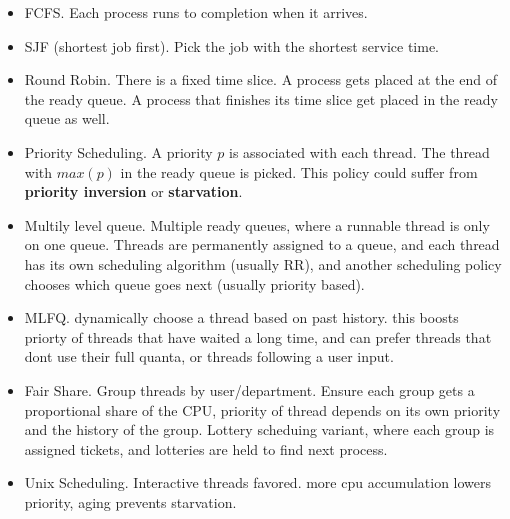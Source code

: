 \begin{itemize}
  \item FCFS. Each process runs to completion when it arrives.
  \item SJF (shortest job first). Pick the job with the shortest service time.
  \item Round Robin. There is a fixed time slice. A process gets placed at the
end of the ready queue. A process that finishes its time slice get placed in
the ready queue as well.
  \item Priority Scheduling. A priority $p$ is associated with each thread. The
thread with $max(p)$ in the ready queue is picked. This policy could suffer
from \textbf{priority inversion} or \textbf{starvation}.
  \item Multily level queue. Multiple ready queues, where a runnable thread is
    only on one queue. Threads are permanently assigned to a queue, and each
    thread has its own scheduling algorithm (usually RR), and another
    scheduling policy chooses which queue goes next (usually priority based).
  \item MLFQ. dynamically choose a thread based on past history. this boosts
    priorty of threads that have waited a long time, and can prefer threads
    that dont use their full quanta, or threads following a user input.
  \item Fair Share. Group threads by user/department. Ensure each group gets a
    proportional share of the CPU, priority of thread depends on its own
    priority and the history of the group. Lottery scheduing variant, where
    each group is assigned tickets, and lotteries are held to find next
    process.
  \item Unix Scheduling. Interactive threads favored. more cpu accumulation
    lowers priority, aging prevents starvation.
\end{itemize}


